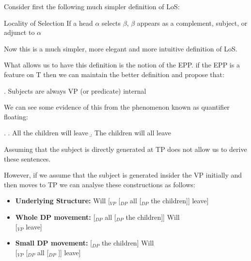\begin{frame}
  Consider first the following much simpler definition of LoS:

  \begin{block}
    {Locality of Selection}
If a head $\alpha$ selects $\beta$, $\beta$ appears as a complement, subject, or adjunct to $\alpha$ 
  \end{block}

Now this is a much simpler, more elegant and more intuitive definition of LoS.

\end{frame}

\begin{frame}
  What allows us to have this definition is the notion of the EPP.  if the EPP is a feature on T then we can maintain the better definition and propose that:

\ex.
Subjects are always VP (or predicate) internal


\end{frame}

\begin{frame}
  We can see some evidence of this from the phenomenon known as quantifier floating:

\ex.
\a. All the children will leave
\b. The children will all leave

Assuming that the subject is directly generated at TP does not allow us to derive these sentences.
  
\end{frame}


\begin{frame}
  However, if we assume that the subject is generated insider the VP initially and then moves to TP we can analyse these constructions as follows:


  \begin{itemize}
  \item \textbf{Underlying Structure:}  Will [$_{VP}$ [$_{DP}$ all [$_{DP}$ the children]] leave]
  \item \textbf{Whole DP movement:} [$_{DP}$ all [$_{DP}$ the children]] Will\\[1pt]
 [$_{VP}$   leave]
 \item \textbf{Small DP movement:} [$_{DP}$ the children] Will\\[1pt]
 [$_{VP}$ [$_{DP}$ all [$_{DP}$ ]]  leave]
  \end{itemize}

\end{frame}



